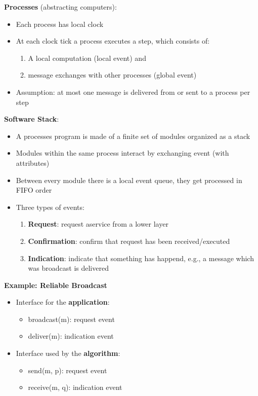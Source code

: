 \documentclass{scrartcl}
\begin{document}
 \textbf{Processes} (abstracting computers):
\begin{itemize}
    \item
        Each process has local clock
    \item
        At each clock tick a process executes a step, which consists of:
        \begin{enumerate}
            \item
                A local computation (local event) and
            \item
                message exchanges with other processes (global event)
        \end{enumerate}
    \item
        Assumption: at most one message is delivered from or sent to a process per step
\end{itemize}

\bigbreak

\textbf{Software Stack}:
\begin{itemize}
    \item
        A processes program is made of a finite set of modules organized as a stack
    \item
        Modules within the same process interact by exchanging event (with attributes)
    \item
        Between every module there is a local event queue, they get processed in FIFO order
    \item
        Three types of events:
        \begin{enumerate}
            \item 
                \textbf{Request}: request aservice from a lower layer
            \item
                \textbf{Confirmation}: confirm that request has been received/executed
            \item
                \textbf{Indication}: indicate that something has happend, e.g., a message which was broadcast is delivered
        \end{enumerate}
\end{itemize}

\textbf{Example: Reliable Broadcast}
\begin{itemize}
    \item
        Interface for the \textbf{application}:
        \begin{itemize}
            \item
                broadcast(m): request event
            \item
                deliver(m): indication event
        \end{itemize}
    \item
        Interface used by the \textbf{algorithm}:
        \begin{itemize}
            \item
                send(m, p): request event
            \item
                receive(m, q): indication event
        \end{itemize}
\end{itemize}
\end{document}
